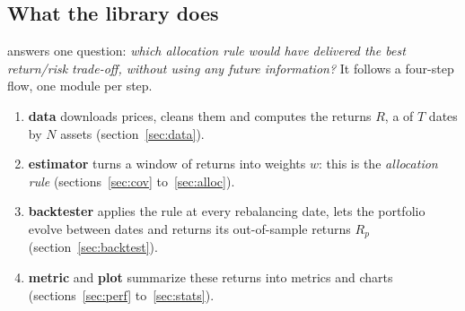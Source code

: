 \documentclass[11pt,a4paper]{article}
\theoremstyle{pdef}
\theoremstyle{pstate}
\newcommand{\py}[1]{{\ttfamily\hyphenchar\font=-1 \detokenize{#1}}}
\begin{document}
\subsection{What the library does}

\py{portopt} answers one question: \emph{which allocation rule would have delivered the
best return/risk trade-off, without using any future information?} It follows a
four-step flow, one module per step.

\begin{center}
\end{center}

\begin{enumerate}
\item \textbf{data} downloads prices, cleans them and computes the returns $R$, a
\py{DataFrame} of $T$ dates by $N$ assets (section~\ref{sec:data}).
\item \textbf{estimator} turns a window of returns into weights $w$: this is the
\emph{allocation rule} (sections~\ref{sec:cov} to~\ref{sec:alloc}).
\item \textbf{backtester} applies the rule at every rebalancing date, lets the portfolio
evolve between dates and returns its out-of-sample returns $R_p$
(section~\ref{sec:backtest}).
\item \textbf{metric} and \textbf{plot} summarize these returns into metrics and charts
(sections~\ref{sec:perf} to~\ref{sec:stats}).
\end{enumerate}
\end{document}
